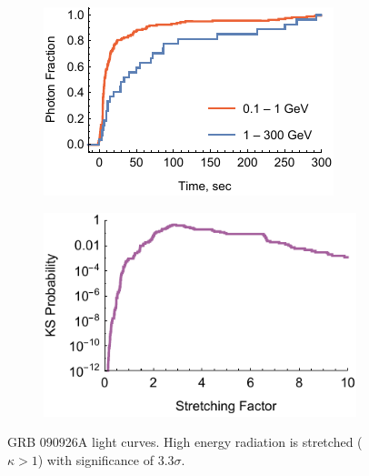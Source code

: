 \documentclass{article}
\begin{document}
\begin{figure}
        \centering
        \begin{subfigure}{0.49\textwidth}
                \includegraphics[width=\textwidth]{lightCurve090926A}
                \label{fig:lightCurve090926A}
        \end{subfigure}
        \begin{subfigure}{0.49\textwidth}
                \includegraphics[width=\textwidth]{probabilities090926A}
                \label{fig:probabilities090926A}
        \end{subfigure}
        \caption{GRB 090926A light curves. High energy radiation is stretched ($\kappa > 1$) with significance of $3.3\sigma$.}
        \label{fig:grb090926A}
\end{figure}
\end{document}
